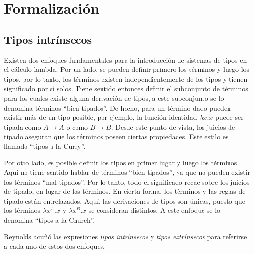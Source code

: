 \newcommand{\const}[1]{\AgdaInductiveConstructor{#1}}
\newcommand{\bound}[1]{\AgdaBound{#1}}
\newcommand{\func}[1]{\AgdaFunction{#1}}
\newcommand{\type}[1]{\AgdaDatatype{#1}}
\newcommand{\snstar}{\type{SN*} \func{⟦\_⟧} }
\newcommand{\cand}[1]{\func{⟦}#1\func{⟧}}

\newcommand{\parens}[1]{\AgdaSymbol{(}#1\AgdaSymbol{)}}
\newcommand{\subst}[2]{\func{⟪}\AgdaSpace{}#1\AgdaSpace{}\func{⟫}\AgdaSpace{}#2}
\newcommand{\cons}[2]{#1 \func{•} #2}
\newcommand{\ids}{\func{ids}}
\newcommand{\comp}[2]{#1 \func{∘} #2}


\section{Formalización}

\subsection{Tipos intrínsecos}

Existen dos enfoques fundamentales para la introducción de sistemas de tipos en el cálculo lambda.
Por un lado, se pueden definir primero los términos y luego los tipos, por lo tanto, los términos existen independientemente de los tipos y tienen significado por sí solos.
Tiene sentido entonces definir el subconjunto de términos para los cuales existe alguna derivación de tipos, a este subconjunto se lo denomina términos ``bien tipados''.
De hecho, para un término dado pueden existir más de un tipo posible, por ejemplo, la función identidad $\lambda x.x$ puede ser tipada como $A \rightarrow A$ o como $B \rightarrow B$.
Desde este punto de vista, los juicios de tipado aseguran que los términos poseen ciertas propiedades.
Este estilo es llamado ``tipos a la Curry''.

Por otro lado, es posible definir los tipos en primer lugar y luego los términos.
Aquí no tiene sentido hablar de términos ``bien tipados'', ya que no pueden existir los términos ``mal tipados''.
Por lo tanto, todo el significado recae sobre los juicios de tipado, en lugar de los términos.
En cierta forma, los términos y las reglas de tipado están entrelazados.
Aquí, las derivaciones de tipos son únicas, puesto que los términos $\lambda x^A.x$ y $\lambda x^B.x$ se consideran distintos.
A este enfoque se lo denomina ``tipos a la Church''.

Reynolds \cite{reynolds_1998} acuñó las expresiones \textit{tipos intrínsecos} y \textit{tipos extrínsecos} para referirse a cada uno de estos dos enfoques.

